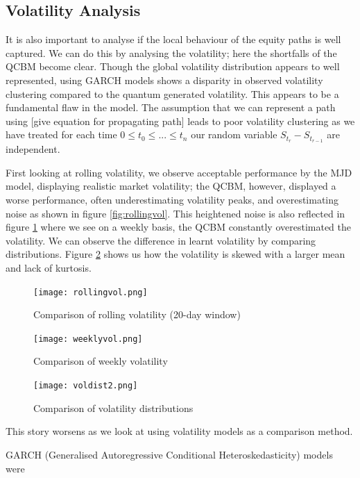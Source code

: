 \documentclass[12pt]{article}
\newcommand{\newp}
    {
    \vskip 0.5cm 
  }
\numberwithin{equation}{section}
\begin{document}
\subsection{Volatility Analysis}
It is also important to analyse if the local behaviour of the equity paths is well 
captured. We can do this by analysing the volatility; here the shortfalls of the 
QCBM become clear. Though the global volatility distribution appears to well 
represented, using GARCH models shows a disparity in observed volatility clustering 
compared to the quantum generated volatility. This appears to be a fundamental 
flaw in the model. The assumption that we can represent a path using [give 
equation for propagating path] leads to poor volatility clustering as we have 
treated for each time $0\leq t_0 \leq ...\leq t_n$ our random variable 
$S_{t_r}-S_{t_{r-1}}$ are independent.
\newp 
First looking at rolling volatility, we observe acceptable performance by the 
MJD model, displaying realistic market volatility; the QCBM, however, displayed 
a worse performance, often underestimating volatility peaks, and overestimating 
noise as shown in figure \ref{fig:rollingvol}.
This heightened noise is also reflected 
in figure \ref{fig:weeklyvol} where we see on a weekly basis, the QCBM 
constantly overestimated the volatility. We can observe the difference in learnt 
volatility by comparing distributions. Figure \ref{fig:voldist2} shows us how the 
volatility is skewed with a larger mean and lack of kurtosis. 
\begin{figure}[h!]
    \centering
    \begin{minipage}{0.48\textwidth}
        \centering
        \texttt{[image: rollingvol.png]}
        \caption{Comparison of rolling volatility (20-day window)}
        \label{fig:rollingvol}
    \end{minipage}
    \hfill
    \begin{minipage}{0.48\textwidth}
        \centering
        \texttt{[image: weeklyvol.png]}
        \caption{Comparison of weekly volatility}
        \label{fig:weeklyvol}
    \end{minipage}
\end{figure}
\begin{figure}[h!]
  \centering 
  \texttt{[image: voldist2.png]}
  \caption{Comparison of volatility distributions}
  \label{fig:voldist2}
\end{figure}
This story worsens as we look at using volatility models as a comparison method. 
\newp
GARCH (Generalised Autoregressive Conditional Heteroskedasticity) models were 
\end{document}
